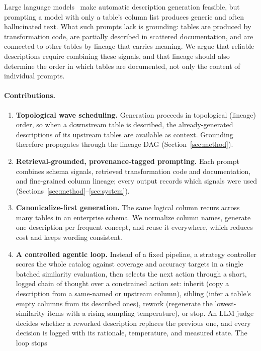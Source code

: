 Large language models~\citep{vaswani2017attention,brown2020language} make automatic
description generation feasible, but prompting a model with only a table's column list
produces generic and often hallucinated text. What such prompts lack is grounding: tables
are produced by transformation code, are partially described in scattered documentation,
and are connected to other tables by lineage that carries meaning. We argue that reliable
descriptions require combining these signals, and that lineage should also determine the
order in which tables are documented, not only the content of individual prompts.

\paragraph{Contributions.}
\begin{enumerate}
  \item \textbf{Topological wave scheduling.} Generation proceeds in topological (lineage)
  order, so when a downstream table is described, the already-generated descriptions of its
  upstream tables are available as context. Grounding therefore propagates through the
  lineage DAG (Section~\ref{sec:method}).
  \item \textbf{Retrieval-grounded, provenance-tagged prompting.} Each prompt combines
  schema signals, retrieved transformation code and documentation, and fine-grained column
  lineage; every output records which signals were used
  (Sections~\ref{sec:method}--\ref{sec:system}).
  \item \textbf{Canonicalize-first generation.} The same logical column recurs across many
  tables in an enterprise schema. We normalize column names, generate one description per
  frequent concept, and reuse it everywhere, which reduces cost and keeps wording consistent.
  \item \textbf{A controlled agentic loop.} Instead of a fixed pipeline, a strategy
  controller scores the whole catalog against coverage and accuracy targets in a single
  batched similarity evaluation, then selects the next action through a short, logged chain
  of thought over a constrained action set: inherit (copy a description from a same-named or
  upstream column), sibling (infer a table's empty columns from its described ones), rework
  (regenerate the lowest-similarity items with a rising sampling temperature), or stop. An
  LLM judge decides whether a reworked description replaces the previous one, and every
  decision is logged with its rationale, temperature, and measured state. The loop stops

\end{enumerate}
